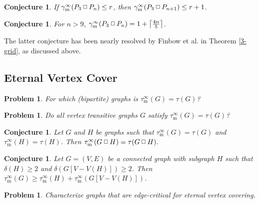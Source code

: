 \documentclass[12pt]{article}%
\newtheorem{conjecture}[theorem]{Conjecture}
\newtheorem{problem}[theorem]{Problem}
\providecommand{\boksie}{\ensuremath{\mathbin{\raisebox{0.3mm}{$\scriptstyle\square$}}}}
\begin{document}
\begin{conjecture}
\emph{\cite{GK2}\hspace{0.1in}}If $\gamma_{\mathrm{m}}^{\infty}(P_{3}\boksie
P_{n})\leq r$, then $\gamma_{\mathrm{m}}^{\infty}(P_{3}\boksie P_{n+1})\leq
r+1$.
\end{conjecture}

\begin{conjecture}
\emph{\cite{GK2}\hspace{0.1in}For }$n>9$, $\gamma_{\mathrm{m}}^{\infty}%
(P_{3}\boksie P_{n})=1+\left\lceil \frac{4n}{5}\right\rceil $.
\end{conjecture}

The latter conjecture has been nearly resolved by Finbow et al. in Theorem
\ref{3-grid}, as discussed above.

\subsection{Eternal Vertex Cover}

\begin{problem}
\emph{\cite{KM5}\hspace{0.1in}}For which (bipartite) graphs is $\tau
_{\mathrm{m}}^{\infty}(G)=\tau(G)$?
\end{problem}

\begin{problem}
\emph{\cite{KM5}\hspace{0.1in}}Do all vertex transitive graphs $G$ satisfy
$\tau_{\mathrm{m}}^{\infty}(G)=\tau(G)$?
\end{problem}

\begin{conjecture}
\emph{\cite{KM5}\hspace{0.1in}}Let $G$ and $H$ be graphs such that
$\tau_{\mathrm{m}}^{\infty}(G)=\tau(G)$ and $\tau_{\mathrm{m}}^{\infty
}(H)=\tau(H)$. Then $\tau_{\mathrm{m}}^{\infty}(G\boksie H)=\tau(G\boksie H).$
\end{conjecture}

\begin{conjecture}
\emph{\cite{KM5}\hspace{0.1in}}Let $G=(V,E)$ be a connected graph with
subgraph $H$ such that $\delta(H)\geq2$ and $\delta(G[V-V(H)])\geq2$. Then
$\tau_{\mathrm{m}}^{\infty}(G)\geq\tau_{\mathrm{m}}^{\infty}(H)+\tau
_{\mathrm{m}}^{\infty}(G[V-V(H)])$.
\end{conjecture}

\begin{problem}
\emph{\cite{KM5}} Characterize graphs that are edge-critical for eternal
vertex covering.
\end{problem}
\end{document}

